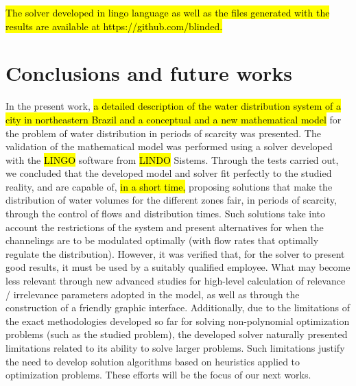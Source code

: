 \documentclass{singlecol}
\theoremstyle{TH}{
\newtheorem{lemma}{Lemma}
\newtheorem{theorem}[lemma]{Theorem}
\newtheorem{corrolary}[lemma]{Corrolary}
\newtheorem{conjecture}[lemma]{Conjecture}
\newtheorem{proposition}[lemma]{Proposition}
\newtheorem{claim}[lemma]{Claim}
\newtheorem{stheorem}[lemma]{Wrong Theorem}
\newtheorem{algorithm}{Algorithm}
}
\theoremstyle{THrm}{
\newtheorem{definition}{Definition}[section]
\newtheorem{question}{Question}[section]
\newtheorem{remark}{Remark}
\newtheorem{scheme}{Scheme}
}
\theoremstyle{THhit}{
\newtheorem{case}{Case}[section]
}
\begin{document}
\hl{The solver developed in lingo language as well as the files generated with the results are available at https://github.com/blinded.}

\section{Conclusions and future works}
\label{sec:conclusions}

In the present work, \hl{a detailed description of the water distribution system of a city in northeastern Brazil and a conceptual and a new mathematical model} for the problem of water distribution in periods of scarcity was presented. The validation of the mathematical model was performed using a solver developed with the \hl{LINGO} software from \hl{LINDO} Sistems. Through the tests carried out, we concluded that the developed model and solver fit perfectly to the studied reality, and are capable of, \hl{in a short time,} proposing solutions that make the distribution of water volumes for the different zones fair, in periods of scarcity, through the control of flows and distribution times. Such solutions take into account the restrictions of the system and present alternatives for when the channelings are to be modulated optimally (with flow rates that optimally regulate the distribution). However, it was verified that, for the solver to present good results, it must be used by a suitably qualified employee. What may become less relevant through new advanced studies for high-level calculation of relevance / irrelevance parameters adopted in the model, as well as through the construction of a friendly graphic interface.  Additionally, due to the limitations of the exact methodologies developed so far for solving non-polynomial optimization problems (such as the studied problem), the developed solver naturally presented limitations related to its ability to solve larger problems. Such limitations justify the need to develop solution algorithms based on heuristics applied to optimization problems. These efforts will be the focus of our next works.


\end{document}
